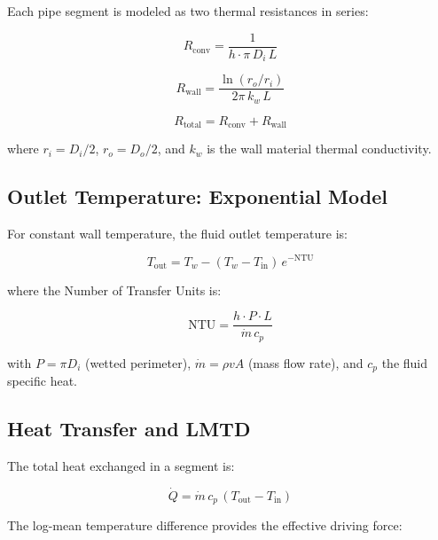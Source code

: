 \documentclass[11pt]{article}
\begin{document}
Each pipe segment is modeled as two thermal resistances in series:

\begin{equation}
  R_{\text{conv}} = \frac{1}{h \cdot \pi \, D_i \, L}
  \label{eq:r-conv}
\end{equation}

\begin{equation}
  R_{\text{wall}} = \frac{\ln(r_o / r_i)}{2\pi \, k_w \, L}
  \label{eq:r-wall}
\end{equation}

\begin{equation}
  R_{\text{total}} = R_{\text{conv}} + R_{\text{wall}}
  \label{eq:r-total}
\end{equation}

where $r_i = D_i/2$, $r_o = D_o/2$, and $k_w$ is the wall material
thermal conductivity.

\subsection{Outlet Temperature: Exponential Model}

For constant wall temperature, the fluid outlet temperature is:

\begin{equation}
  T_{\text{out}} = T_w - (T_w - T_{\text{in}}) \, e^{-\mathrm{NTU}}
  \label{eq:t-out}
\end{equation}

where the Number of Transfer Units is:

\begin{equation}
  \mathrm{NTU} = \frac{h \cdot P \cdot L}{\dot{m} \, c_p}
  \label{eq:ntu}
\end{equation}

with $P = \pi D_i$ (wetted perimeter), $\dot{m} = \rho v A$ (mass flow
rate), and $c_p$ the fluid specific heat.

\subsection{Heat Transfer and LMTD}

The total heat exchanged in a segment is:

\begin{equation}
  \dot{Q} = \dot{m} \, c_p \, (T_{\text{out}} - T_{\text{in}})
  \label{eq:energy-balance}
\end{equation}

The log-mean temperature difference provides the effective driving force:
\end{document}
